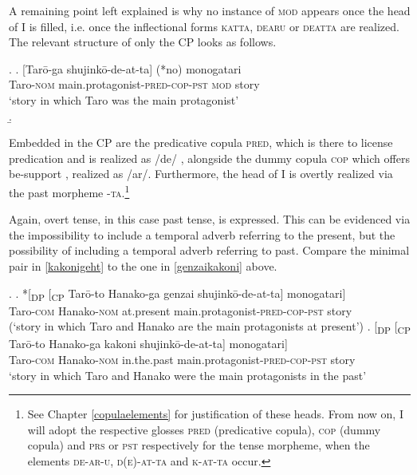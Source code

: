 \documentclass [output=book,colorlinks,citecolor=brown]{langscibook}
\begin{document}
A remaining point left explained is why no instance of \textsc{mod} appears once the head of I is filled, i.e. once the inflectional forms \textsc{katta}, \textsc{dearu} or \textsc{deatta} are realized. The relevant structure of only the CP looks as follows.

\ex. \ag. [Tarō-ga shujinkō-de-at-ta] (*no) monogatari\\
Taro-\textsc{nom} main.protagonist-\textsc{pred-cop-pst} \textsc{mod} story\\
`story in which Taro was the main protagonist' \\ \null \hfill \citep[66]{watanabe:2010:notes} \label{shujinkodeatta}
\b. 

Embedded in the CP are the predicative copula \textsc{pred}, which is there to license predication and is realized as /de/ \citep{bowers:1993:predication, nishiyama:1999:adj}, alongside the dummy copula \textsc{cop} which offers be-support \citep{doron:1983:verbless, rapoport:1987:copular}, realized as /ar/. Furthermore, the head of I is overtly realized via the past morpheme -\textsc{ta}.\footnote{See Chapter \ref{copulaelements} for justification of these heads. From now on, I will adopt the respective glosses \textsc{pred} (predicative copula), \textsc{cop} (dummy copula) and \textsc{prs} or \textsc{pst} respectively for the tense morpheme, when the elements \textsc{de-ar-u}, \textsc{d(e)-at-ta} and \textsc{k-at-ta} occur.}

Again, overt tense, in this case past tense, is expressed. This can be evidenced via the impossibility to include a temporal adverb referring to the present, but the possibility of including a temporal adverb referring to past. Compare the minimal pair in \ref{kakonigeht} to the one in \ref{genzaikakoni} above.

\newpage

\ex. \label{kakonigeht} \ag. *[\textsubscript{DP} [\textsubscript{CP} Tarō-to Hanako-ga genzai shujinkō-de-at-ta] monogatari]\\
{} {} Taro-\textsc{com} Hanako-\textsc{nom} at.present main.protagonist-\textsc{pred-cop-pst} story\\
(`story in which Taro and Hanako are the main protagonists at present’)
 \bg. [\textsubscript{DP} [\textsubscript{CP} Tarō-to Hanako-ga kakoni shujinkō-de-at-ta] monogatari]\\
{} {} Taro-\textsc{com} Hanako-\textsc{nom} in.the.past main.protagonist-\textsc{pred-cop-pst} story\\
`story in which Taro and Hanako were the main protagonists in the past’
\end{document}
